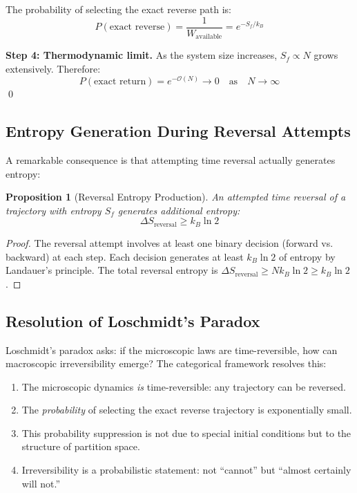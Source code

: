 \documentclass[twocolumn,10pt]{article}
\newtheorem{proposition}[theorem]{Proposition}
\begin{document}
The probability of selecting the exact reverse path is:
\begin{equation}
    P(\text{exact reverse}) = \frac{1}{W_{\text{available}}} = e^{-S_f/k_B}
\end{equation}

\textbf{Step 4: Thermodynamic limit.}
As the system size increases, $S_f \propto N$ grows extensively. Therefore:
\begin{equation}
    P(\text{exact return}) = e^{-\mathcal{O}(N)} \to 0 \quad \text{as} \quad N \to \infty
\end{equation}
\qed

\subsection{Entropy Generation During Reversal Attempts}

A remarkable consequence is that attempting time reversal actually generates entropy:

\begin{proposition}[Reversal Entropy Production]
An attempted time reversal of a trajectory with entropy $S_f$ generates additional entropy:
\begin{equation}
    \Delta S_{\text{reversal}} \geq k_B \ln 2
\end{equation}
\end{proposition}

\begin{proof}
The reversal attempt involves at least one binary decision (forward vs. backward) at each step. Each decision generates at least $k_B \ln 2$ of entropy by Landauer's principle. The total reversal entropy is $\Delta S_{\text{reversal}} \geq N k_B \ln 2 \geq k_B \ln 2$.
\end{proof}

\subsection{Resolution of Loschmidt's Paradox}

Loschmidt's paradox asks: if the microscopic laws are time-reversible, how can macroscopic irreversibility emerge? The categorical framework resolves this:

\begin{enumerate}
    \item The microscopic dynamics \textit{is} time-reversible: any trajectory can be reversed.
    \item The \textit{probability} of selecting the exact reverse trajectory is exponentially small.
    \item This probability suppression is not due to special initial conditions but to the structure of partition space.
    \item Irreversibility is a probabilistic statement: not ``cannot'' but ``almost certainly will not.''
\end{enumerate}
\end{document}
